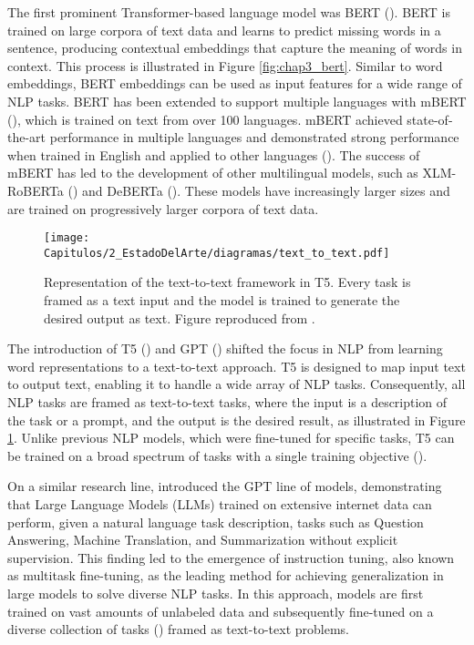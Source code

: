The first prominent Transformer-based language model was BERT (\cite{devlin-etal-2019-bert}). BERT is trained on large corpora of text data and learns to predict missing words in a sentence, producing contextual embeddings that capture the meaning of words in context. This process is illustrated in Figure \ref{fig:chap3_bert}. Similar to word embeddings, BERT embeddings can be used as input features for a wide range of NLP tasks. BERT has been extended to support multiple languages with mBERT (\cite{devlin-etal-2019-bert}), which is trained on text from over 100 languages. mBERT achieved state-of-the-art performance in multiple languages and demonstrated strong performance when trained in English and applied to other languages (\cite{pires-etal-2019-multilingual,artetxe-schwenk-2019-massively}). The success of mBERT has led to the development of other multilingual models, such as XLM-RoBERTa (\cite{conneau-etal-2020-unsupervised}) and DeBERTa (\cite{DBLP:conf/iclr/HeLGC21/deberta}). These models have increasingly larger sizes and are trained on progressively larger corpora of text data.

\begin{figure}[ht]
    \centering
    \texttt{[image: Capitulos/2\_EstadoDelArte/diagramas/text\_to\_text.pdf]}
    \caption{Representation of the text-to-text framework in T5. Every task is framed as a text input and the model is trained to generate the desired output as text. Figure reproduced from \cite{DBLP:journals/jmlr/RaffelSRLNMZLL20-T5}.}
    \label{fig:chap3_textotext}
\end{figure}


The introduction of T5 (\cite{DBLP:journals/jmlr/RaffelSRLNMZLL20-T5}) and GPT (\cite{radford2019language,brown2020language}) shifted the focus in NLP from learning word representations to a text-to-text approach. T5 is designed to map input text to output text, enabling it to handle a wide array of NLP tasks. Consequently, all NLP tasks are framed as text-to-text tasks, where the input is a description of the task or a prompt, and the output is the desired result, as illustrated in Figure \ref{fig:chap3_textotext}. Unlike previous NLP models, which were fine-tuned for specific tasks, T5 can be trained on a broad spectrum of tasks with a single training objective (\cite{chung-flan-instruction-models}). 

On a similar research line, \cite{radford2019language} introduced the GPT line of models, demonstrating that Large Language Models (LLMs) trained on extensive internet data can perform, given a natural language task description, tasks such as Question Answering, Machine Translation, and Summarization without explicit supervision. This finding led to the emergence of instruction tuning, also known as multitask fine-tuning, as the leading method for achieving generalization in large models to solve diverse NLP tasks. In this approach, models are first trained on vast amounts of unlabeled data and subsequently fine-tuned on a diverse collection of tasks (\citep{DBLP:conf/emnlp/WangMAKMNADASPK22,chung-flan-instruction-models}) framed as text-to-text problems.

